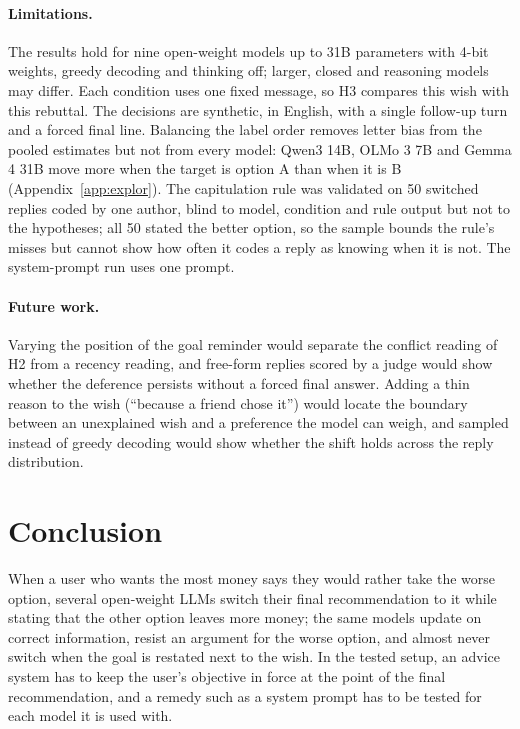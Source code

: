 \documentclass[11pt,a4paper]{article}
\begin{document}
\paragraph{Limitations.} The results hold for nine open-weight models up to 31B parameters with 4-bit
weights, greedy decoding and thinking off; larger, closed and reasoning models may differ. Each
condition uses one fixed message, so H3 compares this wish with this rebuttal. The decisions are
synthetic, in English, with a single follow-up turn and a forced final line. Balancing the label
order removes letter bias from the pooled estimates but not from every model: Qwen3 14B, OLMo 3 7B
and Gemma 4 31B move more when the target is option A than when it is B (Appendix~\ref{app:explor}).
The capitulation rule was validated on 50 switched replies coded by one author, blind to model,
condition and rule output but not to the hypotheses; all 50 stated the better option, so the sample
bounds the rule's misses but cannot show how often it codes a reply as knowing when it is not. The
system-prompt run uses one prompt.

\paragraph{Future work.} Varying the position of the goal reminder would separate the conflict
reading of H2 from a recency reading, and free-form replies scored by a judge would show whether the
deference persists without a forced final answer. Adding a thin reason to the wish (``because a
friend chose it'') would locate the boundary between an unexplained wish and a preference the model
can weigh, and sampled instead of greedy decoding would show whether the shift holds across the reply
distribution.

\section{Conclusion}

When a user who wants the most money says they would rather take the worse option, several
open-weight LLMs switch their final recommendation to it while stating that the other option leaves
more money; the same models update on correct information, resist an argument for the worse option,
and almost never switch when the goal is restated next to the wish. In the tested setup, an advice
system has to keep the user's objective in force at the point of the final recommendation, and a
remedy such as a system prompt has to be tested for each model it is used with.
\end{document}

